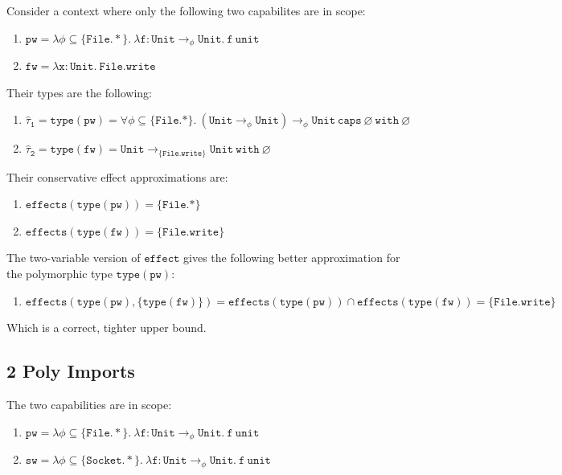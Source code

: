 \documentclass{llncs}
\newcommand{\keywadj}[1]{\mathtt{#1}}
\newcommand{\kwa}[1]{\keywadj{ #1 }}
\newcommand{\unit}[0]{ \kwa{unit} }
\newcommand{\Unit}[0]{ \kwa{Unit} }
\begin{document}
Consider a context where only the following two capabilites are in scope:
\begin{enumerate}
	\item $\kwa{pw = \lambda \phi \subseteq \{\kwa{File.*}\}. ~\lambda f: \Unit \rightarrow_{\phi} \Unit. ~f ~\unit}$
	\item $\kwa{fw = \lambda x: Unit.~File.write}$
\end{enumerate}

\noindent
Their types are the following:

\begin{enumerate}
	\item $\kwa{\hat \tau_1 = type(pw) = \forall \phi \subseteq \{ File.* \}.~(Unit \rightarrow_{\phi} Unit) \rightarrow_{\phi} Unit~caps~\varnothing~with~\varnothing}$
	\item $\kwa{\hat \tau_2 = type(fw) = Unit \rightarrow_{\{File.write\}} Unit~with~\varnothing}$
\end{enumerate}

\noindent
Their conservative effect approximations are:

\begin{enumerate}
	\item $\kwa{effects(type(pw)) = \{File.*\} }$
	\item $\kwa{effects(type(fw)) = \{File.write\} }$
\end{enumerate}

\noindent
The two-variable version of $\kwa{effect}$ gives the following better approximation for the polymorphic type $\kwa{type(pw)}$:

\begin{enumerate}
	\item $\kwa{effects(type(pw), \{ type(fw) \}) = effects(type(pw)) \cap effects(type(fw)) = \{File.write\}}$
\end{enumerate}

\noindent
Which is a correct, tighter upper bound.

\subsection{2 Poly Imports}

The two capabilities are in scope:
\begin{enumerate}
	\item $\kwa{pw = \lambda \phi \subseteq \{\kwa{File.*}\}. ~\lambda f: \Unit \rightarrow_{\phi} \Unit. ~f ~\unit}$
	\item $\kwa{sw = \lambda \phi \subseteq \{\kwa{Socket.*}\}. ~\lambda f: \Unit \rightarrow_{\phi} \Unit. ~f ~\unit}$
\end{enumerate}
\end{document}
